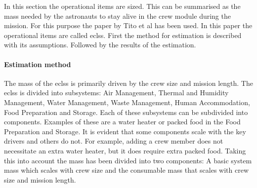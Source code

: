 In this section the operational items are sized. This can be summarised as the mass needed by the astronauts to stay alive in the crew module during the mission. For this purpose the paper by Tito et al \cite{Tito2013} has been used. In this paper the operational items are called \gls{eclss}. First the method for estimation is described with its assumptions. Followed by the results of the estimation.

\paragraph{Estimation method}
\label{par:operationalest}
The mass of the \gls{eclss} is primarily driven by the crew size and mission length. The \gls{eclss} is divided into subsystems: Air Management, Thermal and Humidity Management, Water Management, Waste Management, Human Accommodation, Food Preparation and Storage. Each of these subsystems can be subdivided into components. Examples of these are a water heater or packed food in the Food Preparation and Storage. It is evident that some components scale with the key drivers and others do not. For example, adding a crew member does not necessitate an extra water heater, but it does require extra packed food. Taking this into account the mass has been divided into two components: A basic system mass which scales with crew size and the consumable mass that scales with crew size and mission length.

